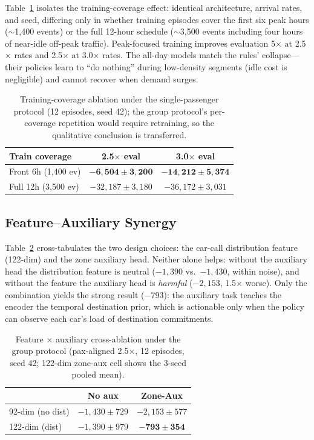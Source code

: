 \documentclass{ieeeaccess}
\begin{document}
Table~\ref{tab:coverage} isolates the training-coverage effect:
identical architecture, arrival rates, and seed, differing only in
whether training episodes cover the first six peak hours
($\sim$1{,}400 events) or the full 12-hour schedule
($\sim$3{,}500 events including four hours of near-idle off-peak
traffic). Peak-focused training improves evaluation 5$\times$ at
2.5$\times$ rates and 2.5$\times$ at 3.0$\times$ rates. The
all-day models match the rules' collapse---their policies learn to
``do nothing'' during low-density segments (idle cost is negligible)
and cannot recover when demand surges.

\begin{table}[t]
\centering
\caption{Training-coverage ablation under the single-passenger protocol (12 episodes, seed 42); the group protocol's per-coverage repetition would require retraining, so the qualitative conclusion is transferred.}
\label{tab:coverage}
\begin{tabular}{@{}lcc@{}}
\toprule
Train coverage & 2.5$\times$ eval & 3.0$\times$ eval \\
\midrule
Front 6h (1{,}400 ev) & $\mathbf{-6{,}504 \pm 3{,}200}$ &
$\mathbf{-14{,}212 \pm 5{,}374}$ \\
Full 12h (3{,}500 ev) & $-32{,}187 \pm 3{,}180$ & $-36{,}172 \pm 3{,}031$ \\
\bottomrule
\end{tabular}
\end{table}

\subsection{Feature--Auxiliary Synergy}
Table~\ref{tab:synergy} cross-tabulates the two design
choices: the car-call distribution feature (122-dim) and the zone
auxiliary head. Neither alone helps: without the auxiliary head the
distribution feature is neutral ($-1{,}390$ vs.~$-1{,}430$, within
noise), and without the feature the auxiliary head is \emph{harmful}
($-2{,}153$, 1.5$\times$ worse). Only the combination yields the
strong result ($-793$): the auxiliary task teaches the encoder the
temporal destination prior, which is actionable only when the policy
can observe each car's load of destination commitments.

\begin{table}[t]
\centering
\caption{Feature $\times$ auxiliary cross-ablation under the group
protocol (pax-aligned 2.5$\times$, 12 episodes, seed 42; 122-dim
zone-aux cell shows the 3-seed pooled mean).}
\label{tab:synergy}
\begin{tabular}{@{}lcc@{}}
\toprule
 & No aux & Zone-Aux \\
\midrule
92-dim (no dist) & $-1{,}430 \pm 729$ & $-2{,}153 \pm 577$ \\
122-dim (dist)   & $-1{,}390 \pm 979$ & $\mathbf{-793 \pm 354}$ \\
\bottomrule
\end{tabular}
\end{table}
\end{document}
